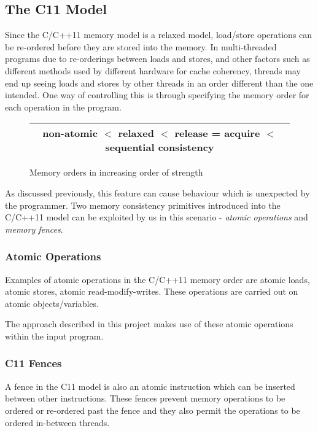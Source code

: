 \subsection{The C11 Model}
\par
Since the C/C++11 \cite{C11} memory model is a relaxed model, load/store operations can be re-ordered before they are stored into the memory. In multi-threaded programs due to re-orderings between loads and stores, and other factors such as different methods used by different hardware for cache coherency, threads may end up seeing loads and stores by other threads in an order different than the one intended. One way of controlling this is through specifying the memory order for each operation in the program.

\begin{figure}
	\begin{center}
		\begin{tabular}{|c|}
		\hline
		non-atomic $<$ relaxed $<$ release = acquire $<$ sequential consistency\\
		\hline
		\end{tabular}
	\caption{Memory orders in increasing order of strength}\label{fig:mo_strength}
	\end{center}
\end{figure}

As discussed previously, this feature can cause behaviour which is unexpected by the programmer. Two memory consistency primitives introduced into the C/C++11 model can be exploited by us in this scenario - \textit{atomic operations} and \textit{memory fences}. 

\subsubsection{Atomic Operations}
Examples of atomic operations in the C/C++11 memory order are atomic loads, atomic stores, atomic read-modify-writes. These operations are carried out on atomic objects/variables.


The approach described in this project makes use of these atomic operations within the input program.

\subsubsection{C11 Fences}
\par
A fence in the C11 model is also an atomic instruction which can be inserted between other instructions. These fences prevent memory operations to be ordered or re-ordered past the fence and they also permit the operations to be ordered in-between threads. 


